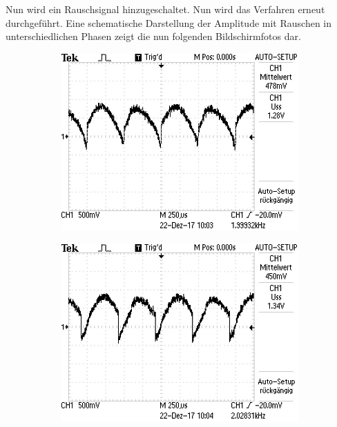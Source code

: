 Nun wird ein Rauschsignal hinzugeschaltet. Nun wird das Verfahren erneut durchgeführt.
Eine schematische Darstellung der Amplitude mit Rauschen in unterschiedlichen Phasen zeigt die nun folgenden
Bildschirmfotos dar.
\begin{figure}[H]
  \centering
  \begin{subfigure}{0.48\textwidth}
	\includegraphics[width=\textwidth]{0GradR.JPG}
\end{subfigure}
\begin{subfigure}{0.48\textwidth}
  \includegraphics[width=\textwidth]{45GradR.JPG}
\end{subfigure}
\begin{subfigure}{0.48\textwidth}

\end{subfigure}
\end{figure}
